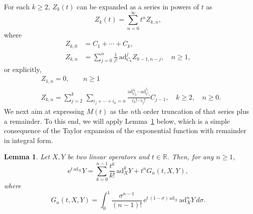 \documentclass[11pt]{article}
\newcommand{\e}{\ensuremath{\mathrm{e}}}
\newcommand{\ad}{\ensuremath{\mathrm{ad}}}
\newtheorem{lemma}{Lemma}[section]
\begin{document}
For each $k\geq 2$, $Z_k(t)$ can be expanded as a series in powers of $t$ as
\begin{equation} \label{zetas_b}
Z_k(t) = \sum_{n=0}^{\infty} t^{n} Z_{k,n}, 
\end{equation}
where
\begin{equation}
\label{eq:Zkn}
\begin{aligned}
Z_{k,0} &= C_1 + \cdots + C_k,\\
 Z_{k,n} &= \sum_{j=0}^n \frac{1}{j!} \,\ad_{C_k}^j Z_{k-1, n-j},\quad n\geq 1,
 \end{aligned}
\end{equation}
or explicitly, 
\begin{equation}
\label{eq:Zkn_explicit}
\begin{aligned}
 & Z_{1,n}=0, \qquad n \ge 1 \\ 
 & Z_{k,n} = \sum_{j=2}^{k} \, \sum_{i_j+\cdots+i_k=n} \frac{\ad_{C_k}^{i_k} \cdots \ad_{C_j}^{i_j}}{i_k! \cdots i_j!} C_{j-1}, \quad k\geq 2, \quad n\geq 0.
\end{aligned} 
\end{equation}
%
We next aim at expressing $M(t)$ as the $n$th order truncation of that series plus a remainder.
 To this end, we will apply Lemma~\ref{l:lemma2} below, which is a simple consequence of the Taylor expansion of the exponential function
with remainder in integral form. 
\begin{lemma} \label{l:lemma2}
    Let $X, Y$ be two linear operators and $t \in \mathbb R$. Then, for any $n\geq 1$, 
        \[
        \e^{t \, \ad_X} Y = \sum_{k=0}^{n-1} \frac{t^k}{k!} \, \ad_X^{k} Y + t^n G_n\left(t, X, Y\right),
    \]
    where
  \begin{equation}
  \label{eq:Gn}
G_n(t, X,Y) = \int_0^1 \frac{\sigma^{n-1}}{(n-1)!} \, \e^{t \, (1-\sigma)\, \ad_X}\, \ad_X^n Y\, d\sigma.
\end{equation}

\end{lemma}

\end{document}
